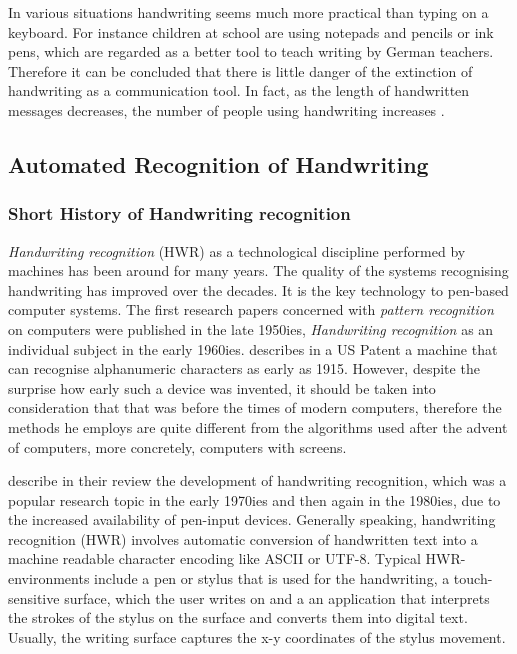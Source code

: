In various situations handwriting seems much more practical than typing on a
keyboard. For instance children at school are using notepads and pencils or
ink pens, which are regarded as a better tool to teach writing by German 
teachers. Therefore it can be concluded that there is little danger of
the extinction of handwriting as a communication tool. In fact, as 
the length of handwritten messages decreases, the number of people using 
handwriting increases .

\subsection{Automated Recognition of Handwriting}
\label{sec:autorecoofhandwriting}

\subsubsection{Short History of Handwriting recognition}
\label{sec:shorthistoryofhwr}

\emph{Handwriting recognition} (HWR) as a technological discipline performed 
by machines has been around for many years. The quality of the systems 
recognising handwriting has improved over the decades. It is the key 
technology to pen-based computer systems. The first research papers 
concerned with \emph{pattern recognition} on computers were published 
in the late 1950ies, \emph{Handwriting recognition} as an individual subject in 
the early 1960ies.  describes in a US Patent
a machine that can recognise alphanumeric characters as early as 1915. 
However, despite the surprise how early such a device was invented,
it should be taken into consideration that that was before the times 
of modern computers, therefore the methods he employs are quite different 
from the algorithms used after the advent of computers, more concretely, 
computers with screens. 

 describe in their review the development of 
handwriting recognition, which was a popular research topic in the early 
1970ies and then again in the 1980ies, due to the increased availability 
of pen-input devices.  Generally speaking, handwriting recognition (HWR) 
involves automatic conversion of handwritten text into a machine readable 
character encoding like ASCII or UTF-8. Typical HWR-environments include 
a pen or stylus that is used for the handwriting, a touch-sensitive surface, 
which the user writes on and a an application that interprets the strokes 
of the stylus on the surface and converts them into digital text. 
Usually, the writing surface captures the x-y coordinates of the stylus 
movement.

